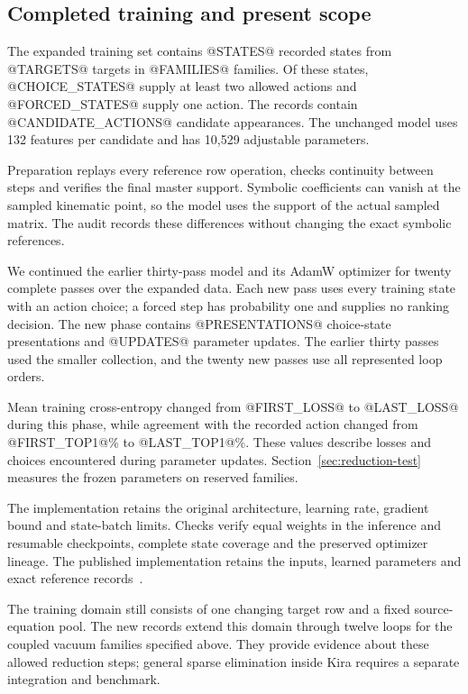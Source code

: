 \subsection{Completed training and present scope}
The expanded training set contains @STATES@ recorded states from
@TARGETS@ targets in @FAMILIES@ families. Of these states,
@CHOICE_STATES@ supply at least two allowed actions and
@FORCED_STATES@ supply one action. The records contain
@CANDIDATE_ACTIONS@ candidate appearances. The unchanged model
uses 132 features per candidate and has 10,529 adjustable parameters.

Preparation replays every reference row operation, checks continuity
between steps and verifies the final master support. Symbolic
coefficients can vanish at the sampled kinematic point, so the model
uses the support of the actual sampled matrix. The audit records
these differences without changing the exact symbolic references.

We continued the earlier thirty-pass model and its AdamW optimizer
for twenty complete passes over the expanded data. Each new pass
uses every training state with an action choice; a forced step has
probability one and supplies no ranking decision. The new phase
contains @PRESENTATIONS@ choice-state presentations and
@UPDATES@ parameter updates. The earlier thirty passes used the
smaller collection, and the twenty new passes use all represented
loop orders.

Mean training cross-entropy changed from @FIRST_LOSS@ to
@LAST_LOSS@ during this phase, while agreement with the recorded
action changed from @FIRST_TOP1@\% to @LAST_TOP1@\%.
These values describe losses and choices encountered during
parameter updates. Section~\ref{sec:reduction-test} measures the
frozen parameters on reserved families.

The implementation retains the original architecture, learning rate,
gradient bound and state-batch limits. Checks verify equal weights
in the inference and resumable checkpoints, complete state coverage
and the preserved optimizer lineage. The published implementation
retains the inputs, learned parameters and exact reference
records~\cite{ReductionModelData}.

The training domain still consists of one changing target row and a
fixed source-equation pool. The new records extend this domain
through twelve loops for the coupled vacuum families specified
above. They provide evidence about these allowed reduction steps;
general sparse elimination inside Kira requires a separate
integration and benchmark.
